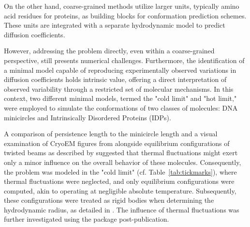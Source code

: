 \documentclass{doctoral}
\newcommand{\code}[1]{\texttt{\detokenize{#1}}}
\begin{document}
On the other hand, coarse-grained methods utilize larger units, typically amino acid residues for proteins, as building blocks for conformation prediction schemes.
These units are integrated with a separate hydrodynamic model to predict diffusion coefficients.

However, addressing the problem directly, even within a coarse-grained perspective, still presents numerical challenges.
Furthermore, the identification of a minimal model capable of reproducing experimentally observed variations in diffusion coefficients holds intrinsic value, offering a direct interpretation of observed variability through a restricted set of molecular mechanisms.
In this context, two different minimal models, termed the "cold limit" and "hot limit," were employed to simulate the conformations of two classes of molecules: DNA minicircles and Intrinsically Disordered Proteins (IDPs).

A comparison of persistence length to the minicircle length and a visual examination of CryoEM figures from \textcite{Irobalieva_2015} alongside equilibrium configurations of twisted beams as described by \textcite{Coleman_2000} suggested that thermal fluctuations might exert only a minor influence on the overall behavior of these molecules.
Consequently, the problem was modeled in the "cold limit" (cf.
Table~\ref{tab:tickmarks}), where thermal fluctuations were neglected, and only equilibrium configurations were computed, akin to operating at negligible absolute temperature.
Subsequently, these configurations were treated as rigid bodies when determining the hydrodynamic radius, as detailed in \textcite{Waszkiewicz_2023_dna}.
The influence of thermal fluctuations was further investigated using the \code{pychastic} package post-publication.
\end{document}
